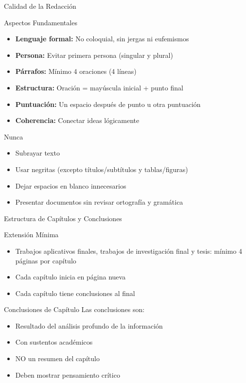 \documentclass[spanish,aspectratio=169]{beamer}
\begin{document}
\begin{frame}{Calidad de la Redacción}
	\begin{block}{Aspectos Fundamentales}
		\begin{itemize}
			\item \textbf{Lenguaje formal:} No coloquial, sin jergas ni eufemismos
			\item \textbf{Persona:} Evitar primera persona (singular y plural)
			\item \textbf{Párrafos:} Mínimo 4 oraciones (4 líneas)
			\item \textbf{Estructura:} Oración = mayúscula inicial + punto final
			\item \textbf{Puntuación:} Un espacio después de punto u otra puntuación
			\item \textbf{Coherencia:} Conectar ideas lógicamente
		\end{itemize}
	\end{block}
	
	\begin{alertblock}{Nunca}
		\begin{itemize}
			\item Subrayar texto
			\item Usar negritas (excepto títulos/subtítulos y tablas/figuras)
			\item Dejar espacios en blanco innecesarios
			\item Presentar documentos sin revisar ortografía y gramática
		\end{itemize}
	\end{alertblock}
\end{frame}

\begin{frame}{Estructura de Capítulos y Conclusiones}
	\begin{block}{Extensión Mínima}
		\begin{itemize}
			\item Trabajos aplicativos finales, trabajos de investigación final y tesis: mínimo 4 páginas por capítulo
			\item Cada capítulo inicia en página nueva
			\item Cada capítulo tiene conclusiones al final
		\end{itemize}
	\end{block}
	
	\begin{block}{Conclusiones de Capítulo}
		Las conclusiones son:
		\begin{itemize}
			\item Resultado del análisis profundo de la información
			\item Con sustentos académicos
			\item NO un resumen del capítulo
			\item Deben mostrar pensamiento crítico
		\end{itemize}
	\end{block}
\end{frame}
\end{document}
